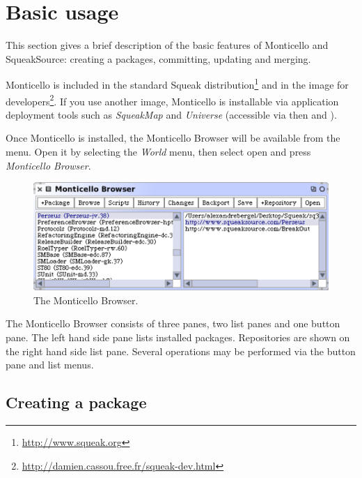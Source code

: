 \documentclass[a4paper,10pt,twoside]{book}
\begin{document}

\section{Basic usage}

This section gives a brief description of the basic features of Monticello and SqueakSource: creating a packages, committing, updating and merging.

Monticello is included in the standard Squeak distribution\footnote{\url{http://www.squeak.org}} and in the image for developers\footnote{\url{http://damien.cassou.free.fr/squeak-dev.html}}. If you use another image, Monticello is installable via application deployment tools such as \emph{SqueakMap} and \emph{Universe} (accessible via  then  and ).

Once Monticello is installed, the Monticello Browser will be available from the  menu. Open it by selecting the \emph{World} menu, then select open and press \emph{Monticello Browser}.

\begin{figure}[ht]\centering
	\includegraphics[width=.75\linewidth]{monticello.png}
	\caption{The Monticello Browser.}
\end{figure}

The Monticello Browser consists of three panes, two list panes and one button pane. The left hand side pane lists installed packages. Repositories are shown on the right hand side list pane. Several operations may be performed via the button pane and list menus.

\subsection{Creating a package}
\end{document}
